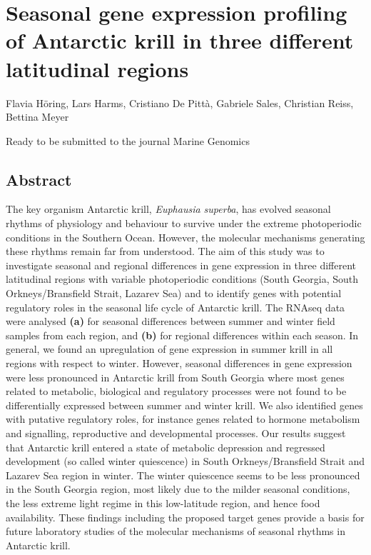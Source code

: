 \chapter{Seasonal gene expression profiling of Antarctic krill in three different latitudinal regions}

Flavia Höring, Lars Harms, Cristiano De Pittà, Gabriele Sales, Christian Reiss,
Bettina Meyer

Ready to be submitted to the journal Marine Genomics

\section*{Abstract}
The key organism Antarctic krill, \textit{Euphausia superba}, has evolved
seasonal rhythms of physiology and behaviour to survive under the extreme
photoperiodic conditions in the Southern Ocean. However, the molecular
mechanisms generating these rhythms remain far from understood. The aim of this
study was to investigate seasonal and regional differences in gene expression
in three different latitudinal regions with variable photoperiodic conditions
(South Georgia, South Orkneys/Bransfield Strait, Lazarev Sea) and to identify
genes with potential regulatory roles in the seasonal life cycle of Antarctic
krill. The RNAseq data were analysed \textbf{(a)} for seasonal differences
between summer and winter field samples from each region, and \textbf{(b)} for
regional differences within each season. In general, we found an upregulation
of gene expression in summer krill in all regions with respect to winter.
However, seasonal differences in gene expression were less pronounced in
Antarctic krill from South Georgia where most genes related to metabolic,
biological and regulatory processes were not found to be differentially
expressed between summer and winter krill. We also identified genes with
putative regulatory roles, for instance genes related to hormone metabolism and
signalling, reproductive and developmental processes. Our results suggest that
Antarctic krill entered a state of metabolic depression and regressed
development (so called winter quiescence) in South Orkneys/Bransfield Strait
and Lazarev Sea region in winter. The winter quiescence seems to be less
pronounced in the South Georgia region, most likely due to the milder seasonal
conditions, the less extreme light regime in this low-latitude region, and
hence food availability. These findings including the proposed target genes
provide a basis for future laboratory studies of the molecular mechanisms of
seasonal rhythms in Antarctic krill.

